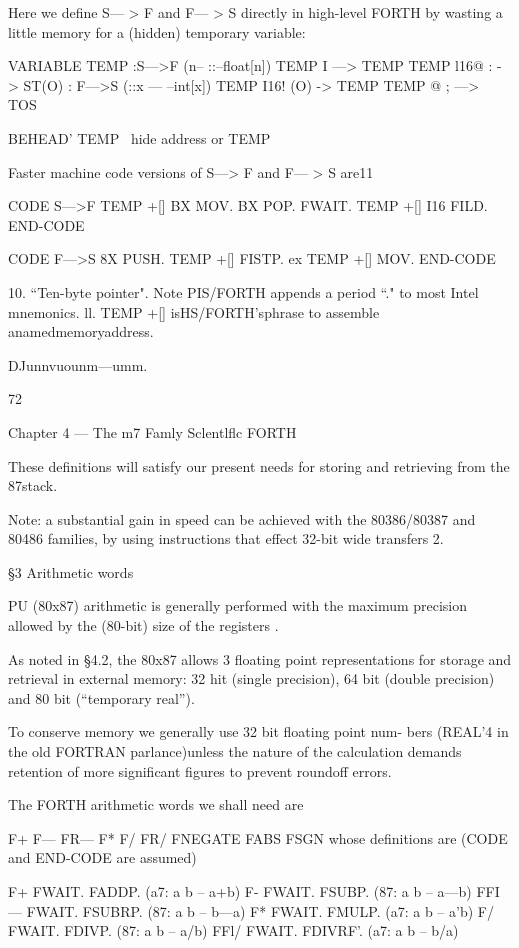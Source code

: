 Here we deﬁne S— > F and F— > S directly in high-level FORTH
by wasting a little memory for a (hidden) temporary variable:

VARIABLE TEMP
:S—>F (n-- ::--float[n])
TEMP I \TOS —> TEMP
TEMP l16@ : \TEMP-> ST(O)
: F—>S (::x — --int[x])
TEMP I16! \ST(O) -> TEMP
TEMP @ ; \TEMP—> TOS

BEHEAD' TEMP \ hide address or TEMP

Faster machine code versions of S—> F and F— > S are11

CODE S—>F TEMP +[] BX MOV. BX POP.
FWAIT. TEMP +[] I16 FILD. END-CODE

CODE F—>S 8X PUSH. TEMP +[] FISTP.
ex TEMP +[] MOV. END-CODE

 

10. “Ten-byte pointer". Note PIS/FORTH appends a period “." to most Intel mnemonics.
ll. TEMP +[] isHS/FORTH’sphrase to assemble anamedmemoryaddress.

DJunnvuounm—umm.

72

Chapter 4 — The m7 Famly Sclentlﬂc FORTH

These deﬁnitions will satisfy our present needs for storing and
retrieving from the 87stack.

Note: a substantial gain in speed can be achieved with the
80386/80387 and 80486 families, by using instructions that effect
32-bit wide transfers 2.

§3 Arithmetic words

PU (80x87) arithmetic is generally performed with the
maximum precision allowed by the (80-bit) size of the
registers .

As noted in §4.2, the 80x87 allows 3 ﬂoating point representations
for storage and retrieval in external memory: 32 hit (single precision),
64 bit (double precision) and 80 bit (“temporary real”).

To conserve memory we generally use 32 bit ﬂoating point num-
bers (REAL'4 in the old FORTRAN parlance)unless the nature
of the calculation demands retention of more signiﬁcant ﬁgures
to prevent roundoff errors.

The FORTH arithmetic words we shall need are

F+ F— FR— F* F/ FR/ FNEGATE FABS FSGN
whose deﬁnitions are (CODE and END-CODE are assumed)

F+ FWAIT. FADDP. (a7: a b -- a+b)
F- FWAIT. FSUBP. (87: a b -- a—b)
FFI— FWAIT. FSUBRP. (87: a b -- b—a)
F* FWAIT. FMULP. (a7: a b -- a'b)
F/ FWAIT. FDIVP. (87: a b -- a/b)
FFl/ FWAIT. FDIVRF’. (a7: a b -- b/a)

